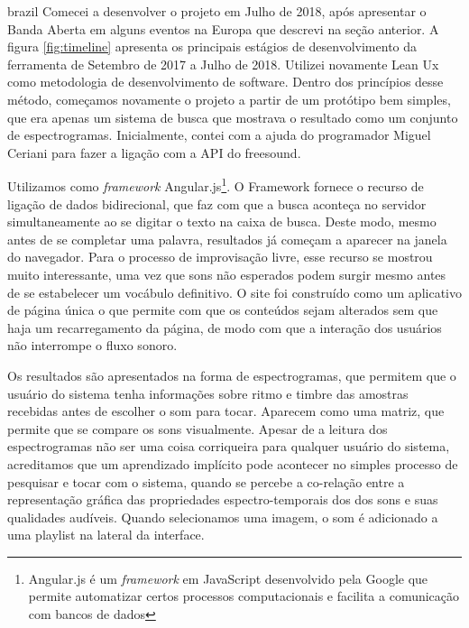 \begin{otherlanguage*}{brazil}
Comecei a desenvolver o projeto em Julho de 2018, após apresentar o Banda Aberta em alguns eventos na Europa que descrevi na seção anterior. A figura \ref{fig:timeline} apresenta os principais estágios de desenvolvimento da ferramenta de Setembro de 2017 a Julho de 2018. Utilizei novamente Lean Ux \cite{Liikkanen2014} como metodologia de desenvolvimento de software. Dentro dos princípios desse método, começamos novamente o projeto a partir de um protótipo bem simples, que era apenas um sistema de busca que mostrava o resultado como um conjunto de espectrogramas. Inicialmente, contei com a ajuda do programador Miguel Ceriani para fazer a ligação com a API do freesound.

Utilizamos como \emph{framework} Angular.js\footnote{Angular.js é um \emph{framework} em JavaScript desenvolvido pela Google que permite automatizar certos processos computacionais e facilita a comunicação com bancos de dados}. O Framework fornece o recurso de ligação de dados bidirecional, que faz com que a busca aconteça no servidor simultaneamente ao se digitar o texto na caixa de busca. Deste modo, mesmo antes de se completar uma palavra, resultados já começam a aparecer na janela do navegador. Para o processo de improvisação livre, esse recurso se mostrou muito interessante, uma vez que sons não esperados podem surgir mesmo antes de se estabelecer um vocábulo definitivo. O site foi construído como um aplicativo de página única \cite{Jadhav} o que permite com que os conteúdos sejam alterados sem que haja um recarregamento da página, de modo com que a interação dos usuários não interrompe o fluxo sonoro.

Os resultados são apresentados na forma de espectrogramas, que permitem que o usuário do sistema tenha informações sobre ritmo e timbre das amostras recebidas antes de escolher o som para tocar. Aparecem como uma matriz, que permite que se compare os sons visualmente. Apesar de a leitura dos espectrogramas não ser uma coisa corriqueira para qualquer usuário do sistema, acreditamos que um aprendizado implícito pode acontecer no simples processo de pesquisar e tocar com o sistema, quando se percebe a co-relação entre a representação gráfica das propriedades espectro-temporais dos dos sons e suas qualidades audíveis. Quando selecionamos uma imagem, o som é adicionado a uma playlist na lateral da interface.


\end{otherlanguage*}
